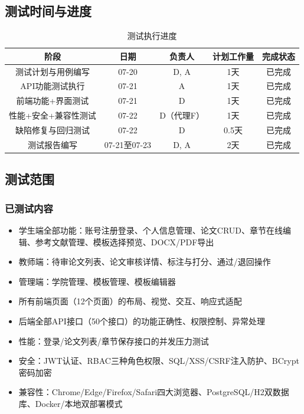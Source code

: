 \documentclass{../softeng}
\begin{document}
\subsection{测试时间与进度}

\begin{table}[htbp]
    \centering
    \caption{测试执行进度}
    \begin{tabular}{|c|c|c|c|c|}
        \hline
        \textbf{阶段} & \textbf{日期} & \textbf{负责人} & \textbf{计划工作量} & \textbf{完成状态} \\
        \hline
        测试计划与用例编写 & 07-20 & D, A & 1天 & 已完成 \\
        \hline
        API功能测试执行 & 07-21 & A & 1天 & 已完成 \\
        \hline
        前端功能+界面测试 & 07-21 & D & 1天 & 已完成 \\
        \hline
        性能+安全+兼容性测试 & 07-22 & D（代理F） & 1天 & 已完成 \\
        \hline
        缺陷修复与回归测试 & 07-22 & D & 0.5天 & 已完成 \\
        \hline
        测试报告编写 & 07-21至07-23 & D, A & 2天 & 已完成 \\
        \hline
    \end{tabular}
\end{table}

\subsection{测试范围}

\subsubsection{已测试内容}
\begin{itemize}
    \item 学生端全部功能：账号注册登录、个人信息管理、论文CRUD、章节在线编辑、参考文献管理、模板选择预览、DOCX/PDF导出
    \item 教师端：待审论文列表、论文审核详情、标注与打分、通过/退回操作
    \item 管理端：学院管理、模板管理、模板编辑器
    \item 所有前端页面（12个页面）的布局、视觉、交互、响应式适配
    \item 后端全部API接口（50个接口）的功能正确性、权限控制、异常处理
    \item 性能：登录/论文列表/章节保存接口的并发压力测试
    \item 安全：JWT认证、RBAC三种角色权限、SQL/XSS/CSRF注入防护、BCrypt密码加密
    \item 兼容性：Chrome/Edge/Firefox/Safari四大浏览器、PostgreSQL/H2双数据库、Docker/本地双部署模式
\end{itemize}
\end{document}
